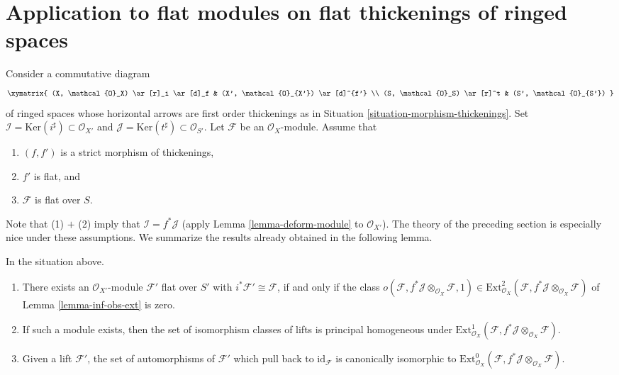\section{Application to flat modules on flat thickenings of ringed spaces}
\label{section-flat}

\noindent
Consider a commutative diagram
$$
\xymatrix{
(X, \mathcal{O}_X) \ar[r]_i \ar[d]_f & (X', \mathcal{O}_{X'}) \ar[d]^{f'} \\
(S, \mathcal{O}_S) \ar[r]^t & (S', \mathcal{O}_{S'})
}
$$
of ringed spaces whose horizontal arrows are first order thickenings as in
Situation \ref{situation-morphism-thickenings}. Set
$\mathcal{I} = \text{Ker}(i^\sharp) \subset \mathcal{O}_{X'}$ and
$\mathcal{J} = \text{Ker}(t^\sharp) \subset \mathcal{O}_{S'}$.
Let $\mathcal{F}$ be an $\mathcal{O}_X$-module. Assume that
\begin{enumerate}
\item $(f, f')$ is a strict morphism of thickenings,
\item $f'$ is flat, and
\item $\mathcal{F}$ is flat over $S$.
\end{enumerate}
Note that (1) $+$ (2) imply that $\mathcal{I} = f^*\mathcal{J}$
(apply Lemma \ref{lemma-deform-module} to $\mathcal{O}_{X'}$).
The theory of the preceding section is especially nice
under these assumptions. We summarize the results already obtained
in the following lemma.

\begin{lemma}
\label{lemma-flat}
In the situation above.
\begin{enumerate}
\item There exists an $\mathcal{O}_{X'}$-module $\mathcal{F}'$ flat over
$S'$ with $i^*\mathcal{F}' \cong \mathcal{F}$, if and only if
the class
$o(\mathcal{F}, f^*\mathcal{J} \otimes_{\mathcal{O}_X} \mathcal{F}, 1)
\in \text{Ext}^2_{\mathcal{O}_X}(
\mathcal{F}, f^*\mathcal{J} \otimes_{\mathcal{O}_X} \mathcal{F})$
of Lemma \ref{lemma-inf-obs-ext} is zero.
\item If such a module exists, then the set of isomorphism classes
of lifts is principal homogeneous under
$\text{Ext}^1_{\mathcal{O}_X}(
\mathcal{F}, f^*\mathcal{J} \otimes_{\mathcal{O}_X} \mathcal{F})$.
\item Given a lift $\mathcal{F}'$, the set of automorphisms of
$\mathcal{F}'$ which pull back to $\text{id}_\mathcal{F}$ is canonically
isomorphic to $\text{Ext}^0_{\mathcal{O}_X}(
\mathcal{F}, f^*\mathcal{J} \otimes_{\mathcal{O}_X} \mathcal{F})$.
\end{enumerate}
\end{lemma}

